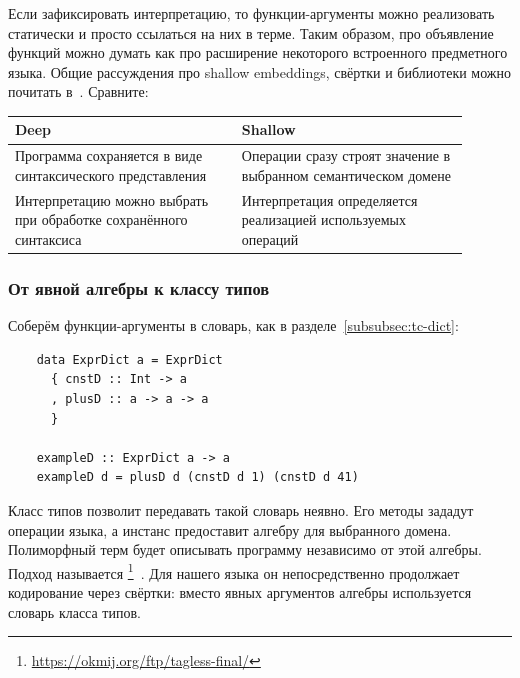 Если зафиксировать интерпретацию, то функции-аргументы можно реализовать статически и просто ссылаться на них в терме.
Таким образом, про объявление функций можно думать как про расширение некоторого встроенного предметного языка.
Общие рассуждения про shallow embeddings, свёртки и библиотеки можно почитать в~\cite{gibbons2013functional, gibbons2014folding}.
Сравните:
\begin{center}
    \begin{tabular}{|p{0.45\linewidth}|p{0.45\linewidth}|}
        \hline
        Deep & Shallow \\
        \hline
        Программа сохраняется в виде синтаксического представления & Операции сразу строят значение в выбранном семантическом домене \\
        \hline
        Интерпретацию можно выбрать при обработке сохранённого синтаксиса & Интерпретация определяется реализацией используемых операций \\
        \hline
    \end{tabular}
\end{center}

\subsubsection{От явной алгебры к классу типов}

Соберём функции-аргументы в словарь, как в разделе~\ref{subsubsec:tc-dict}:
\begin{verbatim}
    data ExprDict a = ExprDict
      { cnstD :: Int -> a
      , plusD :: a -> a -> a
      }

    exampleD :: ExprDict a -> a
    exampleD d = plusD d (cnstD d 1) (cnstD d 41)
\end{verbatim}
Класс типов позволит передавать такой словарь неявно.
Его методы зададут операции языка, а инстанс предоставит алгебру для выбранного домена.
Полиморфный терм будет описывать программу независимо от этой алгебры.
Подход называется \footnote{\url{https://okmij.org/ftp/tagless-final/}}~\cite{carette2007finally, kiselyov2012typed}.
Для нашего языка он непосредственно продолжает кодирование через свёртки: вместо явных аргументов алгебры используется словарь класса типов.

